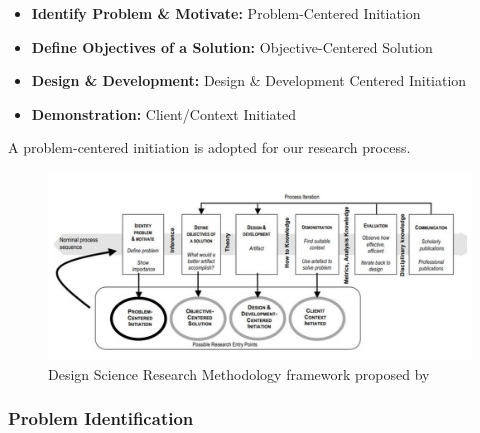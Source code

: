 \begin{itemize}
    \item \textbf{Identify Problem \& Motivate:} Problem-Centered Initiation
    \item \textbf{Define Objectives of a Solution:} Objective-Centered Solution
    \item \textbf{Design \& Development:} Design \& Development Centered Initiation
    \item \textbf{Demonstration:} Client/Context Initiated
\end{itemize}

A problem-centered initiation is adopted for our research process. 

\begin{figure}[htpb]
  \centering
  \includegraphics[width=\textwidth]{figures/dsrm.png}
  \caption{Design Science Research Methodology framework proposed by \cite{Peffers.2007}} \label{fig:dsrm}
\end{figure}

\subsubsection{Problem Identification}

